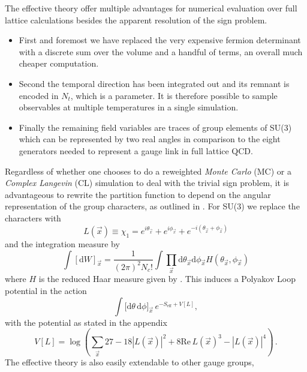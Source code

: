 The effective theory offer multiple advantages for numerical evaluation over
full lattice calculations besides the apparent resolution of the sign problem.
%
\begin{itemize}
  \item First and foremost we have replaced the very expensive fermion
    determinant with a discrete sum over the volume and a handful of terms, an
    overall much cheaper computation.
  \item Second the temporal direction has been integrated out and its remnant is
    encoded in $N_t$, which is a parameter. It is therefore possible to sample
    observables at multiple temperatures in a single simulation.
  \item Finally the remaining field variables are traces of group elements of
    SU($3$) which can be represented by two real angles in comparison to the
    eight generators needed to represent a gauge link in full lattice QCD.
\end{itemize}
%
Regardless of whether one chooses to do a reweighted \emph{Monte Carlo} (MC) or
a \emph{Complex Langevin} (CL) simulation to deal with the trivial sign problem,
it is advantageous to rewrite the partition function to depend on the angular
representation of the group characters, as outlined in .
For SU($3$) we replace the characters with
%
\begin{equation}
  L(\vec{x}) \equiv \chi_1 = e^{i \theta_{\vec{x}}} + e^{i \phi_{\vec{x}}} +
  e^{-i(\theta_{\vec{x}} + \phi_{\vec{x}})}
\end{equation}
%
and the integration measure by
%
\begin{equation}
  \int [\mathrm{d} W]_{\vec{x}} = \frac{1}{(2\pi)^2 N_c!}\int \prod_{\vec{x}} \mathrm{d} \theta_{\vec{x}}
  \mathrm{d} \phi_{\vec{x}} H(\theta_{\vec{x}}, \phi_{\vec{x}})
\end{equation}
%
where $H$ is the reduced Haar measure given by .
This induces a Polyakov Loop potential in the action
%
\begin{equation}
  \int \big[ \mathrm{d} \theta\, \mathrm{d} \phi \big]_{\vec{x}} \,
    e^{-S_{\text{eff}} + V[L]},
\end{equation}
%
with the potential as stated in the appendix
%
\begin{equation}
  V[L] = \log ( \sum_{\vec{x}} 27 - 18 |L(\vec{x})|^2 + 8 \mathrm{Re} \, L(\vec{x})^3 - |L(\vec{x})|^4 )\,.
\end{equation}
%
The effective theory is also easily extendable to other gauge groups,
